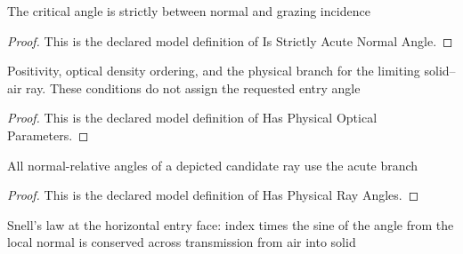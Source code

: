 \begin{definition}
  \label{def:physics:phyx-mini-0096:phyxminiproblems-problemphyxmini0096-isstrictlyacutenormalangle}
  The critical angle is strictly between normal and grazing incidence
\end{definition}
\begin{proof}
  This is the declared model definition of Is Strictly Acute Normal Angle.
\end{proof}
\begin{definition}
  \label{def:physics:phyx-mini-0096:phyxminiproblems-problemphyxmini0096-hasphysicalopticalparameters}
  Positivity, optical density ordering, and the physical branch for the limiting solid--air ray. These conditions do not assign the requested entry angle
\end{definition}
\begin{proof}
  This is the declared model definition of Has Physical Optical Parameters.
\end{proof}
\begin{definition}
  \label{def:physics:phyx-mini-0096:phyxminiproblems-problemphyxmini0096-hasphysicalrayangles}
  All normal-relative angles of a depicted candidate ray use the acute branch
\end{definition}
\begin{proof}
  This is the declared model definition of Has Physical Ray Angles.
\end{proof}
\begin{definition}
  \label{def:physics:phyx-mini-0096:phyxminiproblems-problemphyxmini0096-satisfiesentrysnelllaw}
  Snell's law at the horizontal entry face: index times the sine of the angle from the local normal is conserved across transmission from air into solid
\end{definition}
